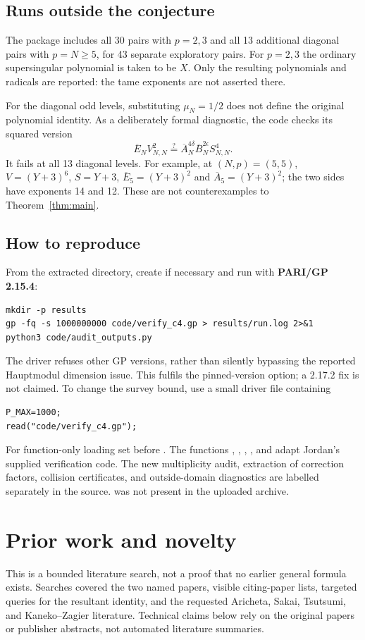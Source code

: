 \documentclass[11pt,a4paper]{article}
\begin{document}
\subsection{Runs outside the conjecture}
The package includes all 30 pairs with $p=2,3$ and all 13 additional diagonal pairs with $p=N\ge5$, for 43 separate exploratory pairs. For $p=2,3$ the ordinary supersingular polynomial is taken to be $X$. Only the resulting polynomials and radicals are reported: the tame exponents are not asserted there.

For the diagonal odd levels, substituting $\mu_N=1/2$ does not define the original polynomial identity. As a deliberately formal diagnostic, the code checks its squared version
\[
 \overline E_N V_{N,N}^2
 \stackrel{?}{=}\overline A_N^{4\delta}\overline B_N^{2\epsilon}S_{N,N}^4.
\]
It fails at all 13 diagonal levels. For example, at $(N,p)=(5,5)$, $V=(Y+3)^6$, $S=Y+3$, $\overline E_5=(Y+3)^2$ and $\overline A_5=(Y+3)^2$; the two sides have exponents 14 and 12. These are not counterexamples to Theorem~\ref{thm:main}.

\subsection{How to reproduce}
From the extracted  directory, create  if necessary and run with \textbf{PARI/GP 2.15.4}:
\begin{Verbatim}[fontsize=\small]
mkdir -p results
gp -fq -s 1000000000 code/verify_c4.gp > results/run.log 2>&1
python3 code/audit_outputs.py
\end{Verbatim}
The driver refuses other GP versions, rather than silently bypassing the reported Hauptmodul dimension issue. This fulfils the pinned-version option; a 2.17.2 fix is not claimed. To change the survey bound, use a small driver file containing
\begin{Verbatim}[fontsize=\small]
P_MAX=1000;
read("code/verify_c4.gp");
\end{Verbatim}
For function-only loading set  before . The functions , , , , and  adapt Jordan's supplied verification code. The new multiplicity audit, extraction of correction factors, collision certificates, and outside-domain diagnostics are labelled separately in the source.  was not present in the uploaded archive.

\section{Prior work and novelty}
This is a bounded literature search, not a proof that no earlier general formula exists. Searches covered the two named papers, visible citing-paper lists, targeted queries for the resultant identity, and the requested Aricheta, Sakai, Tsutsumi, and Kaneko--Zagier literature. Technical claims below rely on the original papers or publisher abstracts, not automated literature summaries.
\end{document}
